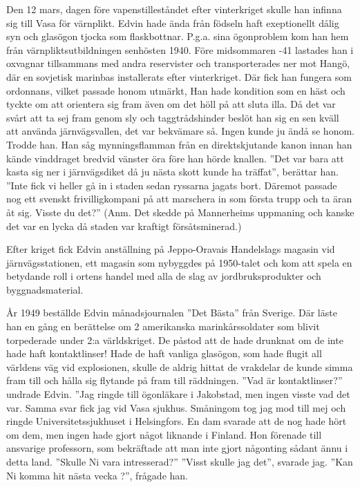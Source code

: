 Den 12 mars, dagen före vapenstilleståndet efter vinterkriget skulle han infinna sig till Vasa för värnplikt. Edvin hade ända från födseln haft exeptionellt dålig syn och glasögon tjocka som flaskbottnar. P.g.a. sina ögonproblem kom han hem från värnpliktsutbildningen senhösten 1940. Före midsommaren -41 lastades han i oxvagnar tillsammans med andra reservister och transporterades ner mot Hangö, där en sovjetisk marinbas installerats efter vinterkriget. Där fick han fungera som ordonnans, vilket passade honom utmärkt, Han hade kondition som en häst och tyckte om att orientera sig fram även om det höll på att sluta illa. Då det var svårt att ta sej fram genom sly och taggtrådshinder beslöt han sig en sen kväll att använda järnvägsvallen, det var bekvämare så. Ingen kunde ju ändå se honom. Trodde han. Han såg mynningsflamman från en direktskjutande kanon innan han kände vinddraget bredvid vänster öra före han hörde knallen. ”Det var bara att kasta sig ner i järnvägsdiket då ju nästa skott kunde ha träffat”, berättar han. ”Inte fick vi heller gå in i staden sedan ryssarna jagats bort. Däremot passade nog ett svenskt frivilligkompani på att marschera in som första trupp och ta äran åt sig. Visste du det?” (Anm. Det skedde på Mannerheims uppmaning och kanske det var en lycka då staden var kraftigt försåtsminerad.)

Efter kriget fick Edvin anställning på Jeppo-Oravais Handelslags magasin vid järnvägsstationen, ett magasin som nybyggdes på 1950-talet och kom att spela en betydande roll i ortens handel med alla de slag av jordbruksprodukter och byggnadsmaterial.

År 1949 beställde Edvin månadsjournalen ”Det Bästa” från Sverige. Där läste han en gång en berättelse om 2 amerikanska marinkårssoldater som blivit torpederade under 2:a världskriget. De påstod att de hade drunknat om de inte hade haft kontaktlinser! Hade de haft vanliga glasögon, som hade flugit all världens väg vid explosionen, skulle de aldrig hittat de vrakdelar de kunde simma fram till och hålla sig flytande på fram till räddningen. ”Vad är kontaktlinser?” undrade Edvin. ”Jag ringde till ögonläkare i Jakobstad, men ingen visste vad det var. Samma svar fick jag vid Vasa sjukhus. Småningom tog jag mod till mej och ringde Universitetssjukhuset i Helsingfors. En dam svarade att de nog hade hört om dem, men ingen hade gjort något liknande i Finland. Hon förenade till ansvarige professorn, som bekräftade att man inte gjort någonting sådant ännu i detta land.
  ”Skulle Ni vara intresserad?”
  ”Visst skulle jag det”, svarade jag.
  ”Kan Ni komma hit nästa vecka ?”, frågade han.


